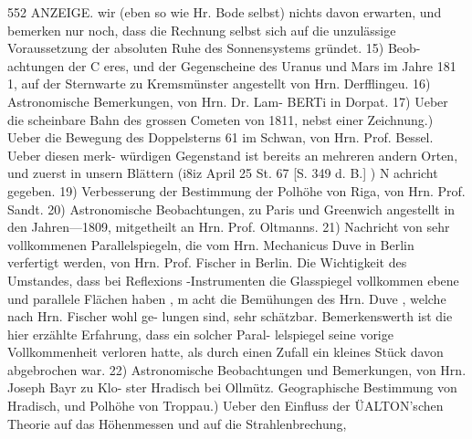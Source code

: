 \documentclass[12pt,a4paper]{article}
\begin{document}
\newpage
552 ANZEIGE.\newline
wir (eben so wie Hr. Bode selbst) nichts davon erwarten, und bemerken nur noch, dass die Rechnung\newline
selbst sich auf die unzulässige Voraussetzung der absoluten Ruhe des Sonnensystems gründet. 15) Beob-\newline
achtungen der C eres, und der Gegenscheine des Uranus und Mars im Jahre 181 1, auf der Sternwarte\newline
zu Kremsmünster angestellt von Hrn. Derfflingeu. 16) Astronomische Bemerkungen, von Hrn. Dr. Lam-\newline
BERTi in Dorpat. 17) Ueber die scheinbare Bahn des grossen Cometen von 1811, nebst einer Zeichnung.) Ueber die Bewegung des Doppelsterns 61 im Schwan, von Hrn. Prof. Bessel. Ueber diesen merk-\newline
würdigen Gegenstand ist bereits an mehreren andern Orten, und zuerst in unsern Blättern (i8iz April 25\newline
St. 67 [S. 349 d. B.] ) N achricht gegeben. 19) Verbesserung der Bestimmung der Polhöhe von Riga, von\newline
Hrn. Prof. Sandt. 20) Astronomische Beobachtungen, zu Paris und Greenwich angestellt in den Jahren---1809, mitgetheilt an Hrn. Prof. Oltmanns. 21) Nachricht von sehr vollkommenen Parallelspiegeln,\newline
die vom Hrn. Mechanicus Duve in Berlin verfertigt werden, von Hrn. Prof. Fischer in Berlin. Die\newline
Wichtigkeit des Umstandes, dass bei Reflexions -Instrumenten die Glasspiegel vollkommen ebene und\newline
parallele Flächen haben , m acht die Bemühungen des Hrn. Duve , welche nach Hrn. Fischer wohl ge-\newline
lungen sind, sehr schätzbar. Bemerkenswerth ist die hier erzählte Erfahrung, dass ein solcher Paral-\newline
lelspiegel seine vorige Vollkommenheit verloren hatte, als durch einen Zufall ein kleines Stück davon\newline
abgebrochen war. 22) Astronomische Beobachtungen und Bemerkungen, von Hrn. Joseph Bayr zu Klo-\newline
ster Hradisch bei Ollmütz. Geographische Bestimmung von Hradisch, und Polhöhe von Troppau.) Ueber den Einfluss der ÜALTON'schen Theorie auf das Höhenmessen und auf die Strahlenbrechung,\newline
\end{document}
